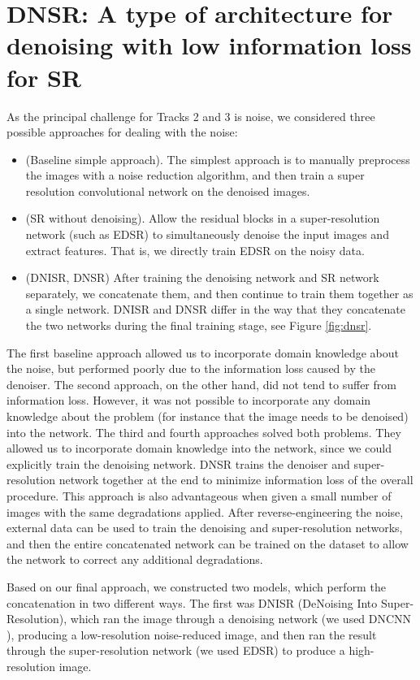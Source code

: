 \documentclass[10pt,twocolumn,letterpaper]{article}
\begin{document}
\section{DNSR: A type of architecture for denoising with low information loss for SR}
As the principal challenge for Tracks 2 and 3 is noise, we considered three possible approaches for dealing with the noise:
\begin{itemize}
\item (Baseline simple approach). The simplest approach is to manually preprocess the images with a noise reduction algorithm, and then train a super resolution convolutional network on the denoised images.
\item (SR without denoising). Allow the residual blocks in a super-resolution network (such as EDSR) to simultaneously denoise the input images and extract features. That is, we directly train EDSR on the noisy data.
\item (DNISR, DNSR) After training the denoising network and SR network separately, we concatenate them, and then continue to train them together as a single network. DNISR and DNSR differ in the way that they concatenate the two networks during the final training stage, see Figure \ref{fig:dnsr}.
\end{itemize}

The first baseline approach allowed us to incorporate domain knowledge about the noise, but performed poorly due to the information loss caused by the denoiser. The second approach, on the other hand, did not tend to suffer from information loss. However, it was not possible to incorporate any domain knowledge about the problem (for instance that the image needs to be denoised) into the network. The third and fourth approaches solved both problems. They allowed us to incorporate domain knowledge into the network, since we could explicitly train the denoising network. DNSR trains the denoiser and super-resolution network together at the end to minimize information loss of the overall procedure. 
This approach is also advantageous when given a small number of images with the same degradations applied. After reverse-engineering the noise, external data can be used to train the denoising and super-resolution networks, and then the entire concatenated network can be trained on the dataset to allow the network to correct any additional degradations.

Based on our final approach, we constructed two models, which perform the concatenation in two different ways. The first was DNISR (DeNoising Into Super-Resolution), which ran the image through a denoising network (we used DNCNN \cite{DNCNN}), producing a low-resolution noise-reduced image, and then ran the result through the super-resolution network (we used EDSR) to produce a high-resolution image. 
\end{document}
